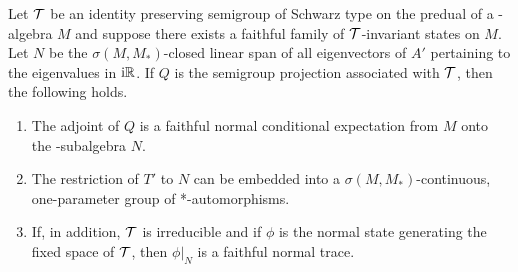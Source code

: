 \begin{theorem}\label{thm:d4-3.5}
Let $\mathcal{T}$ be an identity preserving semigroup of Schwarz type on the predual of a \WA-algebra $M$ and suppose there exists a faithful family of\/ $\mathcal{T}$-invariant states on $M$.
Let $N$ be the $\sigma(M,M_{*})$-closed linear span of all eigenvectors of $A'$ pertaining to the eigenvalues in $\mathrm{i}\mathbb{R}$.
If $Q$ is the semigroup projection associated with $\mathcal{T}$, then the following holds.
\begin{enumerate}[\upshape (i)]
\item 
The adjoint of $Q$ is a faithful normal conditional expectation from $M$ onto the \WA-subalgebra $N$.

\item 
The restriction of $T'$ to $N$ can be embedded into a $\sigma(M,M_{*})$-continuous, one-parameter group of *-automorphisms.

\item 
If, in addition, $\mathcal{T}$ is irreducible and if $\phi$ is the normal state generating the fixed space of\/ $\mathcal{T}$, then $\phi|_{N}$ is a faithful normal trace.

\end{enumerate}
\end{theorem}
